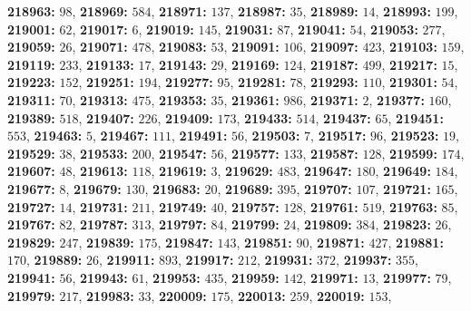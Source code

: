 \textsf{\bfseries 218963:} $98$, \textsf{\bfseries 218969:} $584$, \textsf{\bfseries 218971:} $137$, \textsf{\bfseries 218987:} $35$, \textsf{\bfseries 218989:} $14$, \textsf{\bfseries 218993:} $199$, \textsf{\bfseries 219001:} $62$, \textsf{\bfseries 219017:} $6$, \textsf{\bfseries 219019:} $145$, \textsf{\bfseries 219031:} $87$, \textsf{\bfseries 219041:} $54$, \textsf{\bfseries 219053:} $277$, \textsf{\bfseries 219059:} $26$, \textsf{\bfseries 219071:} $478$, \textsf{\bfseries 219083:} $53$, \textsf{\bfseries 219091:} $106$, \textsf{\bfseries 219097:} $423$, \textsf{\bfseries 219103:} $159$, \textsf{\bfseries 219119:} $233$, \textsf{\bfseries 219133:} $17$, \textsf{\bfseries 219143:} $29$, \textsf{\bfseries 219169:} $124$, \textsf{\bfseries 219187:} $499$, \textsf{\bfseries 219217:} $15$, \textsf{\bfseries 219223:} $152$, \textsf{\bfseries 219251:} $194$, \textsf{\bfseries 219277:} $95$, \textsf{\bfseries 219281:} $78$, \textsf{\bfseries 219293:} $110$, \textsf{\bfseries 219301:} $54$, \textsf{\bfseries 219311:} $70$, \textsf{\bfseries 219313:} $475$, \textsf{\bfseries 219353:} $35$, \textsf{\bfseries 219361:} $986$, \textsf{\bfseries 219371:} $2$, \textsf{\bfseries 219377:} $160$, \textsf{\bfseries 219389:} $518$, \textsf{\bfseries 219407:} $226$, \textsf{\bfseries 219409:} $173$, \textsf{\bfseries 219433:} $514$, \textsf{\bfseries 219437:} $65$, \textsf{\bfseries 219451:} $553$, \textsf{\bfseries 219463:} $5$, \textsf{\bfseries 219467:} $111$, \textsf{\bfseries 219491:} $56$, \textsf{\bfseries 219503:} $7$, \textsf{\bfseries 219517:} $96$, \textsf{\bfseries 219523:} $19$, \textsf{\bfseries 219529:} $38$, \textsf{\bfseries 219533:} $200$, \textsf{\bfseries 219547:} $56$, \textsf{\bfseries 219577:} $133$, \textsf{\bfseries 219587:} $128$, \textsf{\bfseries 219599:} $174$, \textsf{\bfseries 219607:} $48$, \textsf{\bfseries 219613:} $118$, \textsf{\bfseries 219619:} $3$, \textsf{\bfseries 219629:} $483$, \textsf{\bfseries 219647:} $180$, \textsf{\bfseries 219649:} $184$, \textsf{\bfseries 219677:} $8$, \textsf{\bfseries 219679:} $130$, \textsf{\bfseries 219683:} $20$, \textsf{\bfseries 219689:} $395$, \textsf{\bfseries 219707:} $107$, \textsf{\bfseries 219721:} $165$, \textsf{\bfseries 219727:} $14$, \textsf{\bfseries 219731:} $211$, \textsf{\bfseries 219749:} $40$, \textsf{\bfseries 219757:} $128$, \textsf{\bfseries 219761:} $519$, \textsf{\bfseries 219763:} $85$, \textsf{\bfseries 219767:} $82$, \textsf{\bfseries 219787:} $313$, \textsf{\bfseries 219797:} $84$, \textsf{\bfseries 219799:} $24$, \textsf{\bfseries 219809:} $384$, \textsf{\bfseries 219823:} $26$, \textsf{\bfseries 219829:} $247$, \textsf{\bfseries 219839:} $175$, \textsf{\bfseries 219847:} $143$, \textsf{\bfseries 219851:} $90$, \textsf{\bfseries 219871:} $427$, \textsf{\bfseries 219881:} $170$, \textsf{\bfseries 219889:} $26$, \textsf{\bfseries 219911:} $893$, \textsf{\bfseries 219917:} $212$, \textsf{\bfseries 219931:} $372$, \textsf{\bfseries 219937:} $355$, \textsf{\bfseries 219941:} $56$, \textsf{\bfseries 219943:} $61$, \textsf{\bfseries 219953:} $435$, \textsf{\bfseries 219959:} $142$, \textsf{\bfseries 219971:} $13$, \textsf{\bfseries 219977:} $79$, \textsf{\bfseries 219979:} $217$, \textsf{\bfseries 219983:} $33$, \textsf{\bfseries 220009:} $175$, \textsf{\bfseries 220013:} $259$, \textsf{\bfseries 220019:} $153$, 
